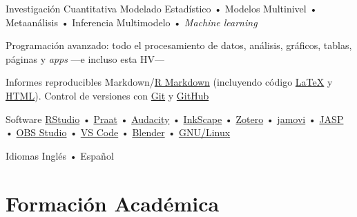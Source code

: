 \documentclass[11pt,a4paper,]{awesome-cv}
\begin{document}
\begin{footnotesize}
\begin{cvskills}
  \cvskill
    {Investigación Cuantitativa}
    {Modelado Estadístico • Modelos Multinivel • Metaanálisis • Inferencia Multimodelo • \textit{Machine learning}}
  
  \cvskill
    {Programación}
    {\href{https://www.r-project.org/}{\faRProject} avanzado: todo el procesamiento de datos, análisis, gráficos, tablas, páginas y \textit{apps} —e incluso esta HV—}

  \cvskill
    {Informes reproducibles}
    {Markdown/\href{https://rmarkdown.rstudio.com/}{R Markdown} (incluyendo código  \href{https://www.latex-project.org/}{{\selectfont\LaTeX}} y \href{https://html.spec.whatwg.org/}{HTML}). Control de versiones con  \href{https://git-scm.com/}{Git} \faGit* y \href{https://github.com/JDLeongomez}{GitHub} \faGithub}

  \cvskill
    {Software}
    {\href{https://posit.co/products/open-source/rstudio/}{RStudio} •  \href{https://www.fon.hum.uva.nl/praat/}{Praat} • \href{https://www.audacityteam.org/}{Audacity} •  \href{https://inkscape.org/}{InkScape} • \href{https://www.zotero.org/}{Zotero} •  \href{https://www.jamovi.org/}{jamovi} • \href{https://jasp-stats.org/}{JASP} •  \href{https://obsproject.com/}{OBS Studio} • \href{https://code.visualstudio.com/}{VS Code} • \href{https://www.blender.org/}{Blender} • \href{https://www.gnu.org/}{GNU/Linux} \faLinux}

  \cvskill
    {Idiomas}
    {Inglés • Español}
\end{cvskills}

\end{footnotesize}

\hypertarget{formaciuxf3n-acaduxe9mica}{%
\section{Formación Académica}\label{formaciuxf3n-acaduxe9mica}}
\end{document}
